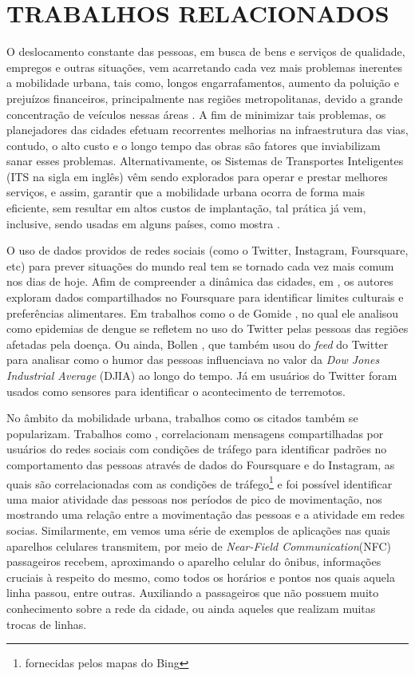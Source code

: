 \section{TRABALHOS RELACIONADOS} \label{sec:trabalhos}
O deslocamento constante das pessoas, em busca de bens e serviços de qualidade, empregos e outras situações, vem acarretando cada vez mais problemas inerentes a mobilidade urbana, tais como, longos engarrafamentos, aumento da poluição e prejuízos financeiros, principalmente nas regiões metropolitanas, devido a grande concentração de veículos nessas áreas \cite{vianna2015busca}. A fim de minimizar tais problemas, os planejadores das cidades efetuam recorrentes melhorias na infraestrutura das vias, contudo, o alto custo e o longo tempo das obras são fatores que inviabilizam sanar esses problemas. Alternativamente, os Sistemas de Transportes Inteligentes (ITS na sigla em inglês) vêm sendo explorados para operar e prestar melhores serviços, e assim, garantir que a mobilidade urbana ocorra de forma mais eficiente, sem resultar em altos custos de implantação, tal prática já vem, inclusive, sendo usadas em alguns países, como mostra \cite{ref:port_its}.

O uso de dados providos de redes sociais (como o Twitter, Instagram, Foursquare, etc) para prever situações do mundo real tem se tornado cada vez mais comum nos dias de hoje. Afim de compreender a dinâmica das cidades, em \cite{silva2014you} , os autores exploram dados compartilhados no Foursquare para identificar limites culturais e preferências alimentares. Em trabalhos como o de Gomide \cite{gomide2011dengue}, no qual ele analisou como epidemias de dengue se refletem no uso do Twitter pelas pessoas das regiões afetadas pela doença. Ou ainda, Bollen \cite{bollen2011twitter}, que também usou do \textit{feed} do Twitter para analisar como o humor das pessoas influenciava no  valor da \textit{Dow Jones Industrial Average} (DJIA) ao longo do tempo. Já em \cite{sakaki2010earthquake} usuários do Twitter foram usados como sensores para identificar o acontecimento de terremotos.

No âmbito da mobilidade urbana, trabalhos como os citados também se popularizam. Trabalhos como \cite{ribeiro2014studying}, correlacionam mensagens compartilhadas por usuários do redes sociais com condições de tráfego para identificar padrões no comportamento das pessoas através de dados do Foursquare e do Instagram, as quais são correlacionadas com as condições de tráfego\footnote{fornecidas pelos mapas do Bing} e foi possível identificar uma maior atividade das pessoas nos períodos de pico de movimentação, nos mostrando uma relação entre a movimentação das pessoas e a atividade em redes socias. Similarmente, em \cite{NASSAR2017} vemos uma série de exemplos de aplicações nas quais aparelhos celulares transmitem, por meio de \emph{Near-Field Communication}(NFC) passageiros recebem, aproximando o aparelho celular do ônibus, informações cruciais à respeito do mesmo, como todos os horários e pontos nos quais aquela linha passou, entre outras. Auxiliando a passageiros que não possuem muito conhecimento sobre a rede da cidade, ou ainda aqueles que realizam muitas trocas de linhas.
